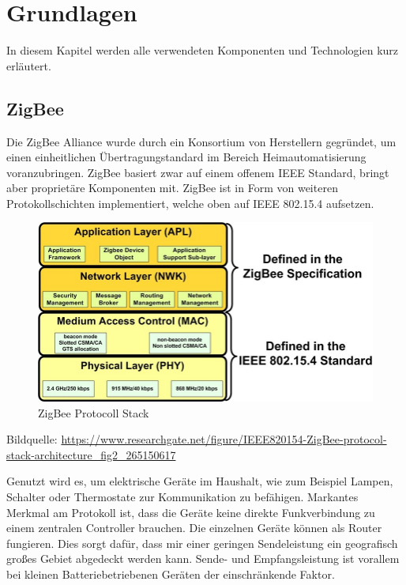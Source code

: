 \chapter{Grundlagen}

In diesem Kapitel werden alle verwendeten Komponenten und Technologien kurz erläutert.
\section{ZigBee}

Die ZigBee Alliance wurde durch ein Konsortium von Herstellern gegründet, um einen einheitlichen Übertragungstandard
im Bereich Heimautomatisierung voranzubringen. ZigBee basiert zwar auf einem offenem IEEE Standard, bringt aber proprietäre Komponenten mit.
ZigBee ist in Form von weiteren Protokollschichten implementiert, welche oben auf IEEE 802.15.4 aufsetzen.

\begin{figure}[H]
  \centering
  \includegraphics[width=1\textwidth]{media/Zigbee Stack.jpg}
  \caption{ZigBee Protocoll Stack}
\end{figure}

Bildquelle: \url{https://www.researchgate.net/figure/IEEE820154-ZigBee-protocol-stack-architecture_fig2_265150617}


Genutzt wird es, um elektrische Geräte im Haushalt, wie zum Beispiel Lampen, Schalter oder Thermostate
zur Kommunikation zu befähigen. Markantes Merkmal am Protokoll ist, dass die Geräte keine direkte Funkverbindung
zu einem zentralen Controller brauchen. Die einzelnen Geräte können als Router fungieren. Dies sorgt dafür,
dass mir einer geringen Sendeleistung ein geografisch großes Gebiet abgedeckt werden kann. Sende- und Empfangsleistung
ist vorallem bei kleinen Batteriebetriebenen Geräten der einschränkende Faktor.


